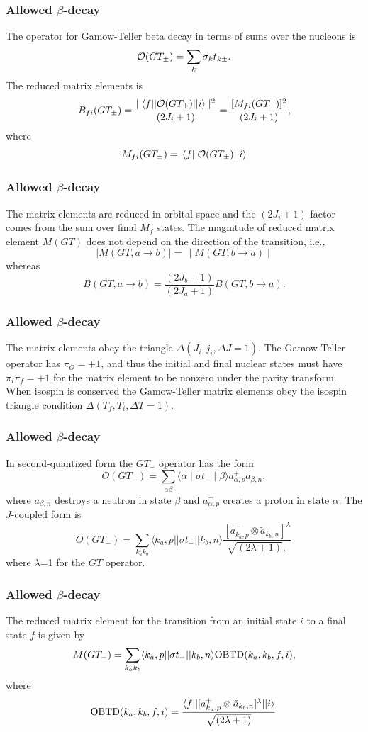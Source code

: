 \documentclass[compress]{beamer}
\begin{document}
 \frame
 {
 \frametitle{Allowed $\beta$-decay}
 \begin{small}
 {\scriptsize
The operator for Gamow-Teller beta decay in terms of sums
over the nucleons is
\[
{\cal O}(GT_{\pm}) =  \displaystyle\sum _{k} \sigma _{k} t_{k\pm}.
\]
The reduced matrix elements is
\[
 B_{fi}(GT_{\pm})
= \frac{\mid \langle f|| {\cal O}(GT_{\pm}) ||i\rangle\mid ^{2}}{(2J_{i}+1)}
= \frac{[M_{fi}(GT_{\pm})]^{2}}{(2J_{i}+1)},
\]
where
\[
     M_{fi}(GT_{\pm}) =\, \langle f|| {\cal O}(GT_{\pm}) ||i\rangle 
\]
 }
 \end{small}
 }
 \frame
 {
 \frametitle{Allowed $\beta$-decay}
 \begin{small}
 {\scriptsize
The matrix elements are reduced in
orbital space and the $  (2J_{i}+1)  $ factor comes from
the sum over final $  M_{f}  $ states.
The magnitude of reduced matrix element
$  M(GT)  $ does not depend on the
direction of the transition, i.e.,
\[
   \mid M(GT,a\rightarrow b)\mid  =\, \mid M(GT,b\rightarrow a)\mid  
\]
whereas
\[
   B(GT,a\rightarrow b) = \frac{(2J_{b}+1)}{(2J_{a}+1)} B(GT,b\rightarrow a). 
\]
 }
 \end{small}
 }
 \frame
 {
 \frametitle{Allowed $\beta$-decay}
 \begin{small}
 {\scriptsize
The matrix elements obey the triangle
$  \Delta (J_{i},j_{i},\Delta J=1)  $. The Gamow-Teller operator
has $  \pi _{O}=+1  $, and thus the
initial and final nuclear states must have $  \pi _{i}\pi _{f}=+1  $ for
the matrix element to be
nonzero under the parity transform. When isospin is conserved
the Gamow-Teller
matrix elements obey the isospin triangle condition
$  \Delta (T_{f},T_{i},\Delta T=1)  $.
 }
 \end{small}
 }
 \frame
 {
 \frametitle{Allowed $\beta$-decay}
 \begin{small}
 {\scriptsize
In second-quantized form the $  GT_{-}  $ operator has the
form
\[
O(GT_{-}) = \displaystyle\sum _{\alpha \beta } \langle \alpha \mid \sigma  t_{-}\mid \beta \rangle a^{+}_{\alpha 
,p} a_{\beta ,n}, 
\]
where $  a_{\beta ,n}  $ destroys a neutron in state $\beta$ and $  a^{+}_{\alpha ,p}  $
creates a proton in state $\alpha$. The $  J  $-coupled form is
\[
O(GT_{-}) = \displaystyle\sum _{k_{a} k_{b}} \langle k_{a},p||\sigma  t_{-}||k_{b},n\rangle
\frac{ [a^{+}_{k_{a},p}\otimes \tilde{a}_{k_{b},n}]^{\lambda }}{ \sqrt{ (2\lambda +1)},}\,       
\]
where $\lambda$=1 for the $  GT  $ operator.

 }
 \end{small}
 }
 \frame
 {
 \frametitle{Allowed $\beta$-decay}
 \begin{small}
 {\scriptsize
The reduced matrix element for the transition from an initial state $  i  $ to
a final state $  f  $ is given by
\[
M(GT_{-}) = \displaystyle\sum _{k_{a} k_{b}} \langle k_{a},p||\sigma  t_{-}||k_{b},n\rangle {\rm 
OBTD}(k_{a},k_{b},f,i), 
\]
where
\[
{\rm OBTD}(k_{a},k_{b},f,i) =
\frac{ \langle f||[a^{+}_{k_{a},p}\otimes \tilde{a}_{k_{b},n}]^{\lambda }||i\rangle}{ \sqrt{ (2\lambda +1)}}\,   
\]
 }
 \end{small}
 }
\end{document}
